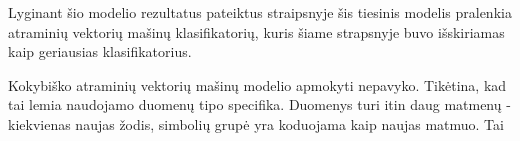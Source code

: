 
Lyginant šio modelio rezultatus pateiktus \cite{comp} straipsnyje šis tiesinis modelis pralenkia atraminių vektorių mašinų klasifikatorių, kuris šiame strapsnyje buvo išskiriamas kaip geriausias klasifikatorius.

Kokybiško atraminių vektorių mašinų modelio apmokyti nepavyko. Tikėtina, kad tai lemia naudojamo duomenų tipo specifika. Duomenys turi itin daug matmenų - kiekvienas naujas žodis, simbolių grupė yra koduojama kaip naujas matmuo. Tai